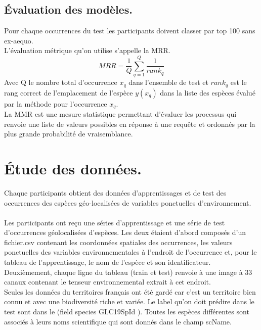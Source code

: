 \documentclass{article}
\begin{document}
\newpage
\subsection{Évaluation des modèles.}
Pour chaque occurrences du test les participants doivent classer par top 100 sans ex-aequo. \\L’évaluation métrique qu’on utilise s’appelle la MRR.
\begin{equation}
    \label{Formule pour calculer le score MRR.}
    MRR = \frac{1}{Q} \sum_{q=1}^{Q} \frac{1}{rank_{q}}
\end{equation}
Avec Q le nombre total d’occurrence $x_{q} $ dans l’ensemble de test et $rank_{q}$ est le rang correct de l’emplacement de l’espèce $y(x_{q})$ dans la liste des espèces évalué par la méthode pour l’occurrence $x_{q}$. \\La MMR est une mesure statistique permettant d’évaluer les processus qui renvoie une liste de valeurs possibles en réponse à une requête et ordonnés par la plus grande probabilité de vraisemblance.

\section{Étude des données.}
Chaque participants obtient des données d'apprentissages et de test des occurrences des espèces géo-localisées de variables ponctuelles d'environnement.\\ \\Les participants ont reçu une séries d'apprentissage et une série de test d'occurrences géolocalisées d'espèces. Les deux étaient d'abord composés d'un fichier.csv contenant les coordonnées spatiales des occurrences, les valeurs ponctuelles des variables environnementales à l'endroit de l'occurrence et, pour le tableau de l'apprentissage, le nom de l'espèce et son identificateur. Deuxièmement, chaque ligne du tableau (train et test) renvoie à une image à 33 canaux contenant le tenseur environnemental extrait à cet endroit.\\
Seules les données du territoires français ont été gardé car c’est un territoire bien connu et avec une biodiversité riche et variée.
Le label qu’on doit prédire dans le test sont dans le (field species GLC19SpId ). Toutes les espèces différentes sont associés à leurs noms scientifique qui sont donnés dans le champ scName.
\end{document}
